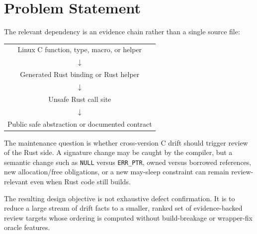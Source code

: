 \section{Problem Statement}

The relevant dependency is an evidence chain rather than a single source file:

\begin{center}
\begin{tabular}{c}
Linux C function, type, macro, or helper \\
$\downarrow$ \\
Generated Rust binding or Rust helper \\
$\downarrow$ \\
Unsafe Rust call site \\
$\downarrow$ \\
Public safe abstraction or documented contract
\end{tabular}
\end{center}

The maintenance question is whether cross-version C drift should trigger review
of the Rust side. A signature change may be caught by the compiler, but a
semantic change such as \texttt{NULL} versus \texttt{ERR\_PTR}, owned versus
borrowed references, new allocation/free obligations, or a new may-sleep
constraint can remain review-relevant even when Rust code still builds.

The resulting design objective is not exhaustive defect confirmation. It is to
reduce a large stream of drift facts to a smaller, ranked set of evidence-backed
review targets whose ordering is computed without build-breakage or wrapper-fix
oracle features.
